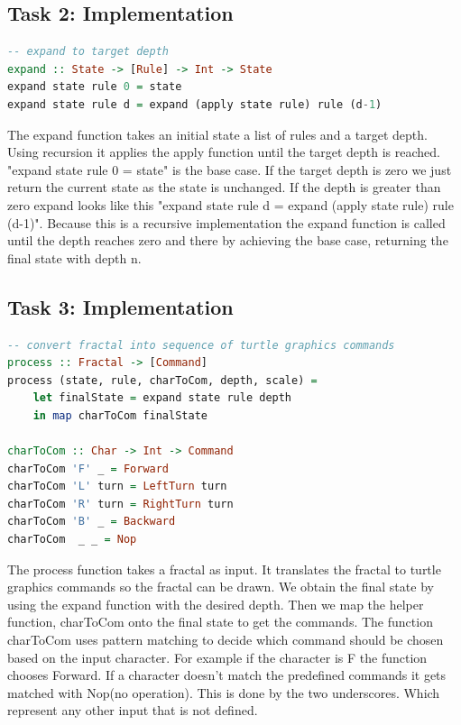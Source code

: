 \documentclass{article}
\begin{document}
\subsection{Task 2: Implementation}
\begin{lstlisting}[language=Haskell]
-- expand to target depth
expand :: State -> [Rule] -> Int -> State
expand state rule 0 = state
expand state rule d = expand (apply state rule) rule (d-1)
\end{lstlisting}
The expand function takes  an initial state a list of rules and a target depth. Using recursion it applies the apply function until the target depth is reached. "expand state rule 0 = state" is the base case. If the target depth is zero we just return the current state as the state is unchanged. If the depth is greater than zero expand looks like this "expand state rule d = expand (apply state rule) rule (d-1)". Because this is a recursive implementation the expand function is called until the depth reaches zero and there by achieving the base case, returning the final state with depth n.

\newpage
\subsection{Task 3: Implementation}
\begin{lstlisting}[language=Haskell]
-- convert fractal into sequence of turtle graphics commands
process :: Fractal -> [Command]
process (state, rule, charToCom, depth, scale) =  
    let finalState = expand state rule depth
    in map charToCom finalState

charToCom :: Char -> Int -> Command
charToCom 'F' _ = Forward 
charToCom 'L' turn = LeftTurn turn
charToCom 'R' turn = RightTurn turn
charToCom 'B' _ = Backward
charToCom  _ _ = Nop
\end{lstlisting}
The process function takes a fractal as input. It translates the fractal to turtle graphics commands so the fractal can be drawn. We obtain the final state by using the expand function with the desired depth. Then we map the helper function, charToCom onto the final state to get the commands. The function charToCom uses pattern matching to decide which command should be chosen based on the input character. For example if the character is F the function chooses Forward. If a character doesn't match the predefined commands it gets matched with Nop(no operation). This is done by the two underscores. Which represent any other input that is not defined.
\end{document}
